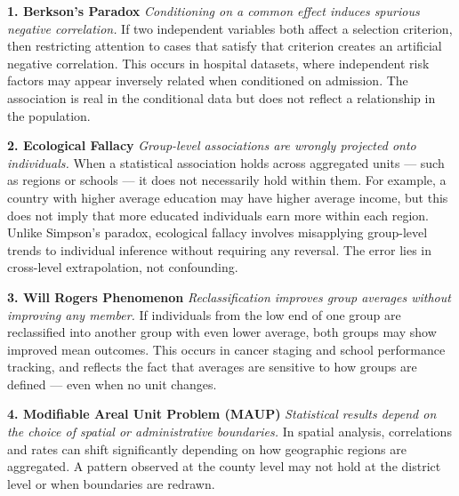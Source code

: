 \begin{tcolorbox}[
  colback=gray!2,
  colframe=gray!60,
  boxrule=0.4pt,
  width=\textwidth,
  arc=1pt,
  left=8pt,
  right=8pt,
  top=6pt,
  bottom=6pt,
  shadow={0mm}{-0.5mm}{0mm}{gray!30}
]

\textbf{1. Berkson’s Paradox}  
\emph{Conditioning on a common effect induces spurious negative correlation.}  
If two independent variables both affect a selection criterion, then restricting attention to cases that satisfy that criterion creates an artificial negative correlation. This occurs in hospital datasets, where independent risk factors may appear inversely related when conditioned on admission. The association is real in the conditional data but does not reflect a relationship in the population.

\vspace{1em}

\textbf{2. Ecological Fallacy}  
\emph{Group-level associations are wrongly projected onto individuals.}  
When a statistical association holds across aggregated units — such as regions or schools — it does not necessarily hold within them. For example, a country with higher average education may have higher average income, but this does not imply that more educated individuals earn more within each region. Unlike Simpson’s paradox, ecological fallacy involves misapplying group-level trends to individual inference without requiring any reversal. The error lies in cross-level extrapolation, not confounding.

\vspace{1em}

\textbf{3. Will Rogers Phenomenon}  
\emph{Reclassification improves group averages without improving any member.}  
If individuals from the low end of one group are reclassified into another group with even lower average, both groups may show improved mean outcomes. This occurs in cancer staging and school performance tracking, and reflects the fact that averages are sensitive to how groups are defined — even when no unit changes.

\vspace{1em}

\textbf{4. Modifiable Areal Unit Problem (MAUP)}  
\emph{Statistical results depend on the choice of spatial or administrative boundaries.}  
In spatial analysis, correlations and rates can shift significantly depending on how geographic regions are aggregated. A pattern observed at the county level may not hold at the district level or when boundaries are redrawn.


\end{tcolorbox}

